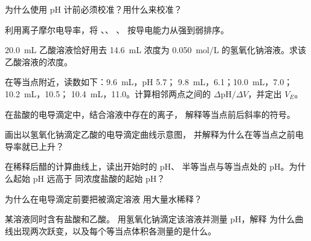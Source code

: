 \begin{exercise}[$\star$]\label{exo:g12:ph-conductivity-titrations:4}
为什么使用 pH 计前必须校准？用什么来校准？
\end{exercise}

\begin{exercise}[$\star$]\label{exo:g12:ph-conductivity-titrations:5}
利用离子摩尔电导率，将 、、
、 按导电能力从强到弱排序。
\end{exercise}

\begin{exercise}[$\star\star$]\label{exo:g12:ph-conductivity-titrations:6}
\qty{20.0}{mL} 乙酸溶液恰好用去 \qty{14.6}{mL}
浓度为 \qty{0.050}{mol/L} 的氢氧化钠溶液。求该乙酸溶液的浓度。
\end{exercise}

\begin{exercise}[$\star\star$]\label{exo:g12:ph-conductivity-titrations:7}
在等当点附近，读数如下：\qty{9.6}{mL}，pH 5.7；
\qty{9.8}{mL}，6.1；\qty{10.0}{mL}，7.0；\qty{10.2}{mL}，10.5；
\qty{10.4}{mL}，11.0。计算相邻两点之间的
$\Delta\mathrm{pH}/\Delta V$，并定出 $V_E$。
\end{exercise}

\begin{exercise}[$\star\star$]\label{exo:g12:ph-conductivity-titrations:8}
在盐酸的电导滴定中，结合溶液中存在的离子，
解释等当点前后斜率的符号。
\end{exercise}

\begin{exercise}[$\star\star$]\label{exo:g12:ph-conductivity-titrations:9}
画出以氢氧化钠滴定乙酸的电导滴定曲线示意图，
并解释为什么在等当点之前电导率就已上升？
\end{exercise}

\begin{exercise}[$\star\star$]\label{exo:g12:ph-conductivity-titrations:10}
在稀释后醋的计算曲线上，读出开始时的 pH、
半等当点与等当点处的 pH。为什么起始 pH 远高于
同浓度盐酸的起始 pH？
\end{exercise}

\begin{exercise}[$\star\star$]\label{exo:g12:ph-conductivity-titrations:11}
为什么在电导滴定前要把被滴定溶液
用大量水稀释？
\end{exercise}

\begin{exercise}[$\star\star\star$]\label{exo:g12:ph-conductivity-titrations:12}
某溶液同时含有盐酸和乙酸。
用氢氧化钠滴定该溶液并测量 pH，解释
为什么曲线出现两次跃变，以及每个等当点体积各测量的是什么。
\end{exercise}

